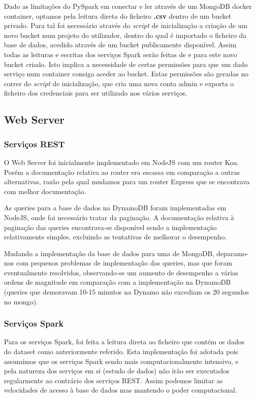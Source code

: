\documentclass[11pt,a4paper]{article}
\begin{document}
Dado as limitações do PySpark em conectar e ler através de um MongoDB docker container, optamos pela leitura direta do ficheiro \textbf{.csv} dentro de um bucket privado. Para tal foi necessário através do \textit{script} de inicialização a criação de um novo bucket num projeto do utilizador, dentro do qual é importado o ficheiro da base de dados, acedido através de um bucket publicamente disponível. Assim todas as leituras e escritas dos serviços Spark serão feitas de e para este novo bucket criado. Isto implica a necessidade de certas permissões para que um dado serviço num container consiga aceder ao bucket. Estas permissões são geradas no correr do \textit{script} de inicialização, que cria uma nova conta admin e exporta o ficheiro dos credenciais para ser utilizado nos vários serviços.

\subsection{Web Server}
\subsubsection{Serviços REST}
O Web Server foi inicialmente implementado em NodeJS com um router Koa. Porém a documentação relativa ao router era escassa em comparação a outras alternativas, razão pela qual mudamos para um router Express que se encontrava com melhor documentação.

As queries para a base de dados na DynamoDB foram implementadas em NodeJS, onde foi necessário tratar da paginação. A documentação relativa à paginação das queries encontrava-se disponível sendo a implementação relativamente simples, excluindo as tentativas de melhorar o desempenho.

Mudando a implementação da base de dados para uma de MongoDB, deparamo-nos com pequenos problemas de implementação das queries, mas que foram eventualmente resolvidos, observando-se um aumento de desempenho a várias ordens de magnitude em comparação com a implementação na DynamoDB (queries que demoravam 10-15 minutos na Dynamo não excediam os 20 segundos no mongo).

\subsubsection{Serviços Spark}
Para os serviços Spark, foi feita a leitura direta ao ficheiro que contém os dados do dataset como anteriormente referido. Esta implementação foi adotada pois assumimos que os serviços Spark sendo mais computacionalmente intensivo, e pela natureza dos serviços em si (estudo de dados) não irão ser executados regularmente ao contrário dos serviços REST. Assim podemos limitar as velocidades de acesso à base de dados mas mantendo o poder computacional.
\end{document}
